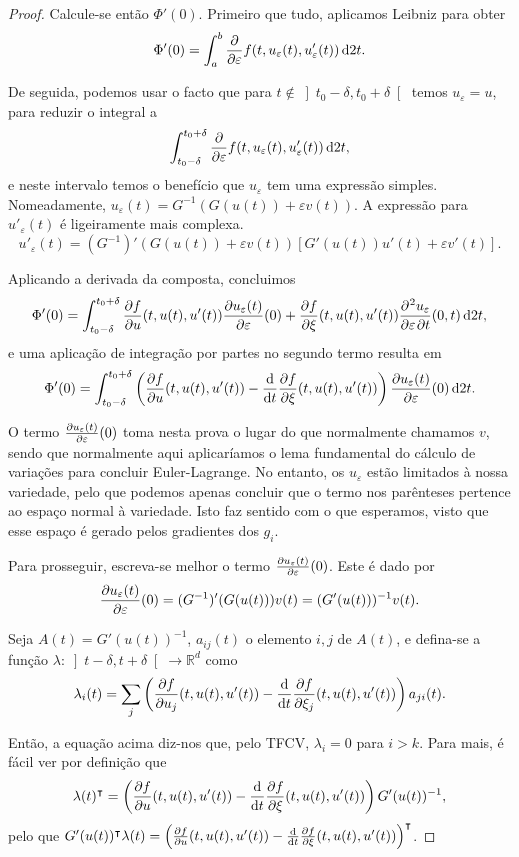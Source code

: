 \documentclass{article}
\theoremstyle{nonumberplain}
\theoremstyle{nonumberplain}
\newtheorem{proof}{Proof}
\newcommand{\R}{\mathbb{R}}
\newcommand{\tr}{\intercal}
\begin{document}
\begin{proof}
Calcule-se então $\Phi'(0)$. Primeiro que tudo, aplicamos Leibniz para obter
\[\Phi'(0) = \int_a^b \diffp*{f(t, u_\varepsilon(t), u'_\varepsilon(t))}\varepsilon \dl2 t.\]

De seguida, podemos usar o facto que para $t \not \in \left]t_0-\delta,t_0+\delta\right[$ temos $u_\varepsilon = u$, para reduzir o integral a
\[\int_{t_0 - \delta}^{t_0 + \delta} \diffp*{f(t, u_\varepsilon(t), u'_\varepsilon(t))}\varepsilon \dl2 t,\]
e neste intervalo temos o benefício que $u_\varepsilon$ tem uma expressão simples. Nomeadamente, $u_\varepsilon(t) = G^{-1}(G(u(t)) + \varepsilon v(t))$. A expressão para $u'_\varepsilon(t)$ é ligeiramente mais complexa.
\[u'_\varepsilon(t) = (G^{-1})'(G(u(t)) + \varepsilon v(t)) [G'(u(t)) u'(t) + \varepsilon v'(t)].\]

Aplicando a derivada da composta, concluimos
\[\Phi'(0) = \int_{t_0 - \delta}^{t_0 + \delta} \diffp fu (t, u(t), u'(t)) \diffp {u_\varepsilon(t)} \varepsilon(0) + \diffp f \xi (t, u(t), u'(t)) \diffp{u_\varepsilon}{\varepsilon, t}(0,t)\dl2 t,\]
e uma aplicação de integração por partes no segundo termo resulta em
\[\Phi'(0) = \int_{t_0 - \delta}^{t_0 + \delta} \left( \diffp fu (t, u(t), u'(t))  - \diff*{\diffp f \xi (t, u(t), u'(t))}t \right) \diffp {u_\varepsilon(t)} \varepsilon(0)\dl2 t.\]

O termo $\diffp {u_\varepsilon(t)} \varepsilon(0)$ toma nesta prova o lugar do que normalmente chamamos $v$, sendo que normalmente aqui aplicaríamos o lema fundamental do cálculo de variações para concluir Euler-Lagrange. No entanto, os $u_\varepsilon$ estão limitados à nossa variedade, pelo que podemos apenas concluir que o termo nos parênteses pertence ao espaço normal à variedade. Isto faz sentido com o que esperamos, visto que esse espaço é gerado pelos gradientes dos $g_i$.

Para prosseguir, escreva-se melhor o termo $\diffp {u_\varepsilon(t)} \varepsilon(0)$. Este é dado por
\[\diffp {u_\varepsilon(t)} \varepsilon(0) = (G^{-1})'(G(u(t))) v(t) = (G'(u(t)))^{-1} v(t).\]

Seja $A(t) = G'(u(t))^{-1}$, $a_{ij}(t)$ o elemento $i,j$ de $A(t)$, e defina-se a função $\lambda \colon \left]t-\delta,t+\delta\right[ \to \R^d$ como
\[\lambda_i(t) = \sum_j \left( \diffp f{u_j} (t, u(t), u'(t))  - \diff*{\diffp f {\xi_j} (t, u(t), u'(t))}t \right) a_{ji}(t). \]

Então, a equação acima diz-nos que, pelo TFCV, $\lambda_i = 0$ para $i > k$. Para mais, é fácil ver por definição que
\[\lambda(t)^\tr = \left( \diffp fu (t, u(t), u'(t))  - \diff*{\diffp f \xi (t, u(t), u'(t))}t \right) G'(u(t))^{-1},\]
pelo que $G'(u(t))^\tr \lambda(t) = \left( \diffp fu (t, u(t), u'(t))  - \diff*{\diffp f \xi (t, u(t), u'(t))}t \right)^\tr$.


\end{proof}
\end{document}
